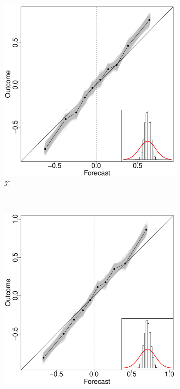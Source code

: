 \documentclass[11pt]{article}
\theoremstyle{definition}
\theoremstyle{definition}
\begin{document}
\begin{figure}[t!]
        \centering
        \begin{subfigure}[b]{0.323\textwidth}
                \includegraphics[width=\textwidth]{SimDepELP}
                \caption{$\bar{\mathcal{X}}$}
        \label{RelEWAHigh}
        \end{subfigure}%
        ~ %
        \begin{subfigure}[b]{0.323\textwidth}
                \includegraphics[width=\textwidth]{SimDepOLP}

\end{subfigure}
\end{figure}
\end{document}
